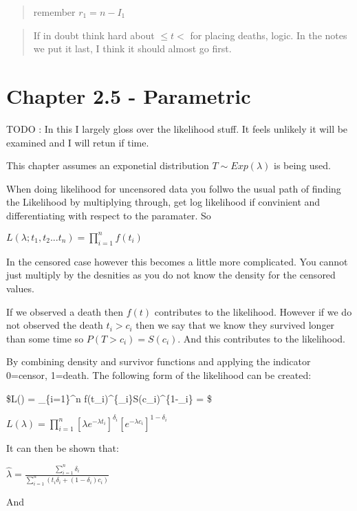 \documentclass[
  letterpaper,
  DIV=11,
  numbers=noendperiod]{scrreprt}
\begin{document}
\begin{quote}
remember \(r_1 = n - I_1\)
\end{quote}

\begin{quote}
If in doubt think hard about \(\leq t <\) for placing deaths, logic. In
the notes we put it last, I think it should almost go first.
\end{quote}

\hypertarget{chapter-2.5---parametric}{%
\section{Chapter 2.5 - Parametric}\label{chapter-2.5---parametric}}

TODO : In this I largely gloss over the likelihood stuff. It feels
unlikely it will be examined and I will retun if time.

This chapter assumes an exponetial distribution \(T \sim Exp(\lambda)\)
is being used.

When doing likelihood for uncensored data you follwo the usual path of
finding the Likelihood by multiplying through, get log likelihood if
convinient and differentiating with respect to the paramater. So

\(L(\lambda ; t_1, t_2 ... t_n) = \prod^n_{i=1}f(t_i)\)

In the censored case however this becomes a little more complicated. You
cannot just multiply by the desnities as you do not know the density for
the censored values.

If we observed a death then \(f(t)\) contributes to the likelihood.
However if we do not observed the death \(t_i > c_i\) then we say that
we know they survived longer than some time so \(P(T > c_i) = S(c_i)\).
And this contributes to the likelihood.

By combining density and survivor functions and applying the indicator
0=censor, 1=death. The following form of the likelihood can be created:

\$L(\lambda) = \prod\_\{i=1\}\^{}n
f(t\_i)\^{}\{\delta\_i\}S(c\_i)\^{}\{1-\delta\_i\} = \$

\(L(\lambda) = \prod_{i=1}^n [\lambda e^{-\lambda t_i}]^{\delta_i}[e^{-\lambda c_i}]^{1-\delta_i}\)

It can then be shown that:

\(\hat{\lambda} = \frac{\sum^n_{i=1} \delta_i}{\sum^n_{i=1}(t_i\delta_i +(1-\delta_i)c_i)}\)

And
\end{document}
